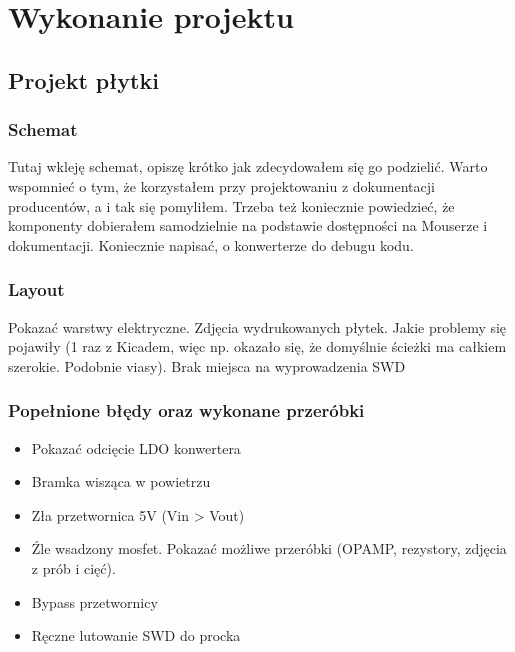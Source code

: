 \chapter{Wykonanie projektu}
\label{cha:course}

\section{Projekt płytki}
\subsection{Schemat}
Tutaj wkleję schemat, opiszę krótko jak zdecydowałem się go podzielić. Warto wspomnieć o tym, że korzystałem przy projektowaniu z dokumentacji producentów, a i tak się pomyliłem. Trzeba też koniecznie powiedzieć, że komponenty dobierałem samodzielnie na podstawie dostępności na Mouserze i dokumentacji.
Koniecznie napisać, o konwerterze do debugu kodu.
\subsection{Layout}
Pokazać warstwy elektryczne. Zdjęcia wydrukowanych płytek. Jakie problemy się pojawiły (1 raz z Kicadem, więc np. okazało się, że domyślnie ścieżki ma całkiem szerokie. Podobnie viasy). Brak miejsca na wyprowadzenia SWD

\subsection{Popełnione błędy oraz wykonane przeróbki}
\begin{itemize}
    \item Pokazać odcięcie LDO konwertera
    \item Bramka wisząca w powietrzu
    \item Zła przetwornica 5V (Vin > Vout)
    \item Źle wsadzony mosfet. Pokazać możliwe przeróbki (OPAMP, rezystory, zdjęcia z prób i cięć).
    \item Bypass przetwornicy
    \item Ręczne lutowanie SWD do procka
\end{itemize}

